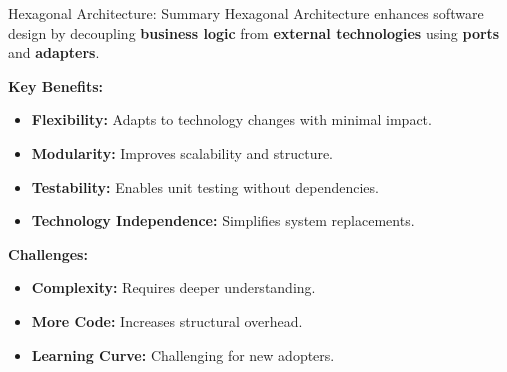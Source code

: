 \documentclass[aspectratio=169, table]{beamer}
\begin{document}
\begin{frame}[fragile]{Hexagonal Architecture: Summary}
	\vspace{20pt}
	Hexagonal Architecture enhances software design by decoupling \textbf{business logic} from \textbf{external technologies} using \textbf{ports} and \textbf{adapters}.
	
	\textbf{Key Benefits:}
	\begin{itemize}
		\item \textbf{Flexibility:} Adapts to technology changes with minimal impact.
		\item \textbf{Modularity:} Improves scalability and structure.
		\item \textbf{Testability:} Enables unit testing without dependencies.
		\item \textbf{Technology Independence:} Simplifies system replacements.
	\end{itemize}
	
	\textbf{Challenges:}
	\begin{itemize}
		\item \textbf{Complexity:} Requires deeper understanding.
		\item \textbf{More Code:} Increases structural overhead.
		\item \textbf{Learning Curve:} Challenging for new adopters.
	\end{itemize}
	
\end{frame}
\end{document}
